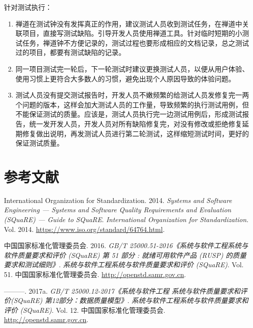 \documentclass[hyperref, a4paper]{ctexart}
\begin{document}
针对测试执行：

\begin{enumerate}
\def\labelenumi{\arabic{enumi}.}
\item
  禅道在测试钟没有发挥真正的作用，建议测试人员收到测试任务，在禅道中关联项目，直接写测试缺陷。引导开发人员使用禅道工具。针对临时短期的小测试任务，禅道钟不方便记录的，测试过程也要形成相应的文档记录，总之测试过的项目，都要有测试缺陷的记录。
\item
  同一项目测试完一轮后，下一轮测试时建议更换测试人员，以便从用户体验、使用习惯上更符合大多数人的习惯，避免出现个人原因导致的体验问题。
\item
  测试人员没有提交测试报告时，开发人员不嫩频繁的给测试人员发修复完一两个问题的版本，这样会加大测试人员的工作量，导致频繁的执行测试用例，但不能保证测试的质量。应该是，测试人员执行完一边测试用例后，形成测试报告，统一发开发人员，开发人员对所有缺陷修复完，对没有修改或拒绝修复延期修复做出说明，再发测试人员进行第二轮测试，这样缩短测试时间，更好的保证测试质量。
\end{enumerate}

\pagebreak

\hypertarget{ux53c2ux8003ux6587ux732e}{%
\section*{参考文献}\label{ux53c2ux8003ux6587ux732e}}

\hypertarget{refs}{}
\leavevmode\hypertarget{ref-innovativeInternationalisation}{}%
International Organization for Standardization. 2014. \emph{Systems and
Software Engineering --- Systems and Software Quality Requirements and
Evaluation (SQuaRE) --- Guide to SQuaRE}. \emph{International
Organization for Standardization}. Vol. 2014.
\url{https://www.iso.org/standard/64764.html}.

\leavevmode\hypertarget{ref-innovative1}{}%
中国国家标准化管理委员会. 2016. \emph{GB/T
25000.51-2016《系统与软件工程系统与软件质量要求和评价 (SQuaRE) 第 51
部分 : 就绪可用软件产品 (RUSP) 的质量要求和测试细则》}.
\emph{系统与软件工程系统与软件质量要求和评价 (SQuaRE)}. Vol. 51.
中国国家标准化管理委员会. \url{http://openstd.samr.gov.cn}.

\leavevmode\hypertarget{ref-innovative3}{}%
---------. 2017a. \emph{GB/T 25000.12-2017《系统与软件工程
系统与软件质量要求和评价(SQuaRE) 第12部分：数据质量模型》}.
\emph{系统与软件工程系统与软件质量要求和评价 (SQuaRE)}. Vol. 12.
中国国家标准化管理委员会. \url{http://openstd.samr.gov.cn}.
\end{document}
